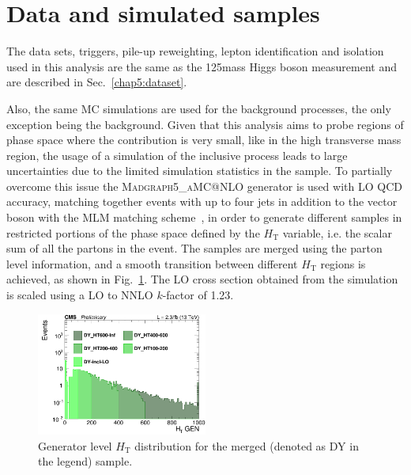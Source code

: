 \section{Data and simulated samples}\label{chap6:datatsets}

The data sets, triggers, pile-up reweighting, lepton identification and isolation used in this analysis are the same as the 125\GeV mass Higgs boson measurement and are described in Sec.~\ref{chap5:dataset}.

Also, the same MC simulations are used for the background processes, the only exception being the \dyll background. Given that this analysis aims to probe regions of phase space where the \dyll contribution is very small, like in the high transverse mass region, the usage of a simulation of the inclusive \dyll process leads to large uncertainties due to the limited simulation statistics in the sample. To partially overcome this issue the \textsc{Madgraph5\_aMC@NLO} generator is used with LO QCD accuracy, matching together events with up to four jets in addition to the vector boson with the MLM matching scheme~\cite{Alwall:2007fs}, in order to generate different \dyll samples in restricted portions of the phase space defined by the $H_\mathrm{T}$ variable, i.e. the scalar sum of all the partons \pt in the event. 
The samples are merged using the parton level information, and a smooth transition between different $H_\mathrm{T}$ regions is achieved, as shown in Fig.~\ref{fig:DY_HT}. The \dyll LO cross section obtained from the simulation is scaled using a LO to NNLO $k$-factor of 1.23.

\begin{figure}[htbp]
\centering
\includegraphics[width=0.5\textwidth]{images/13TeV/log_c_incl_HTGen.png}
\caption{
    Generator level $H_\mathrm{T}$ distribution for the merged \dyll (denoted as DY in the legend) sample.}
    \label{fig:DY_HT}
\end{figure}

